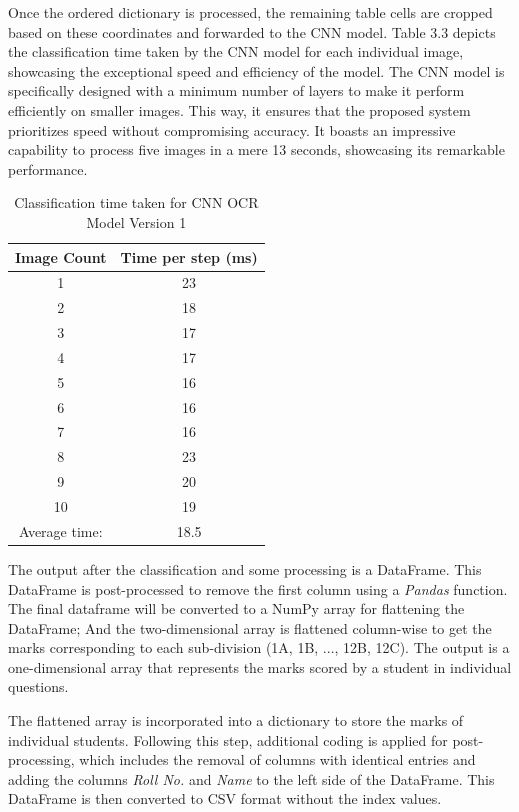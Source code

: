 \clearpage

\noindent Once the ordered dictionary is processed, the remaining table cells are cropped based on these coordinates and forwarded to the CNN model. Table 3.3 depicts the classification time taken by the CNN model for each individual image, showcasing the exceptional speed and efficiency of the model. The CNN model is specifically designed with a minimum number of layers to make it perform efficiently on smaller images. This way, it ensures that the proposed system prioritizes speed without compromising accuracy. It boasts an impressive capability to process five images in a mere 13 seconds, showcasing its remarkable performance.

\begin{table}[htbp]
    \centering
    \begin{tabular}{|c|c|}
        \hline
        Image Count & Time per step (ms) \\
        \hline
        1 & 23 \\
        2 & 18 \\
        3 & 17 \\
        4 & 17 \\
        5 & 16 \\
        6 & 16 \\
        7 & 16 \\
        8 & 23 \\
        9 & 20 \\
        10 & 19 \\
        \hline
        Average time: & 18.5 \\
        \hline
    \end{tabular}
    \caption{Classification time taken for CNN OCR Model Version 1}
\end{table}

\noindent The output after the classification and some processing is a DataFrame. This DataFrame is post-processed to remove the first column using a \textit{Pandas} function.\\

\noindent The final dataframe will be converted to a NumPy array for flattening the DataFrame; And the two-dimensional array is flattened column-wise to get the marks corresponding to each sub-division (1A, 1B, ..., 12B, 12C). The output is a one-dimensional array that represents the marks scored by a student in individual questions.

\clearpage

\noindent The flattened array is incorporated into a dictionary to store the marks of individual students. Following this step, additional coding is applied for post-processing, which includes the removal of columns with identical entries and adding the columns \textit{Roll No.} and \textit{Name} to the left side of the DataFrame. This DataFrame is then converted to CSV format without the index values.\\

